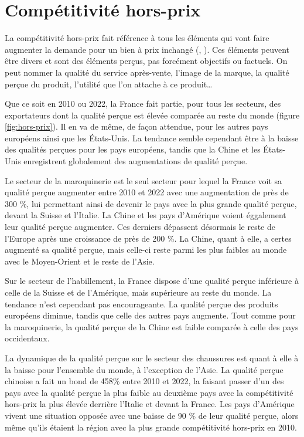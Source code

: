 \documentclass[french,10pt,a4paper]{article}
\begin{document}
\section{Compétitivité hors-prix}
La compétitivité hors-prix fait référence à tous les éléments qui vont faire augmenter la demande pour un bien à prix inchangé (\cite{Khandelwal2013}, \cite{Bas2015}). Ces éléments peuvent être divers et sont des éléments perçus, pas forcément objectifs ou factuels. On peut nommer la qualité du service après-vente, l'image de la marque, la qualité perçue du produit, l'utilité que l'on attache à ce produit…

Que ce soit en 2010 ou 2022, la France fait partie, pour tous les secteurs, des exportateurs dont la qualité perçue est élevée comparée au reste du monde (figure \ref{fig:hors-prix}). Il en va de même, de façon attendue, pour les autres pays européens ainsi que les États-Unis. La tendance semble cependant être à la baisse des qualités perçues pour les pays européens, tandis que la Chine et les États-Unis enregistrent globalement des augmentations de qualité perçue.

Le secteur de la maroquinerie est le seul secteur pour lequel la France voit sa qualité perçue augmenter entre 2010 et 2022 avec une augmentation de près de 300 \%, lui permettant ainsi de devenir le pays avec la plus grande qualité perçue, devant la Suisse et l'Italie. La Chine et les pays d'Amérique voient éggalement leur qualité perçue augmenter. Ces derniers dépassent désormais le reste de l'Europe après une croissance de près de 200 \%. La Chine, quant à elle, a certes augmenté sa qualité perçue, mais celle-ci reste parmi les plus faibles au monde avec le Moyen-Orient et le reste de l'Asie.

Sur le secteur de l'habillement, la France dispose d'une qualité perçue inférieure à celle de la Suisse et de l'Amérique, mais supérieure au reste du monde. La tendance n'est cependant pas encourageante. La qualité perçue des produits européens diminue, tandis que celle des autres pays augmente. Tout comme pour la maroquinerie, la qualité perçue de la Chine est faible comparée à celle des pays occidentaux.

La dynamique de la qualité perçue sur le secteur des chaussures est quant à elle à la baisse pour l'ensemble du monde, à l'exception de l'Asie. La qualité perçue chinoise a fait un bond de 458\% entre 2010 et 2022, la faisant passer d'un des pays avec la qualité perçue la plus faible au deuxième pays avec la compétitivité hors-prix la plus élevée derrière l'Italie et devant la France. Les pays d'Amérique vivent une situation opposée avec une baisse de 90 \% de leur qualité perçue, alors même qu'ils étaient la région avec la plus grande compétitivité hors-prix en 2010.
\end{document}
